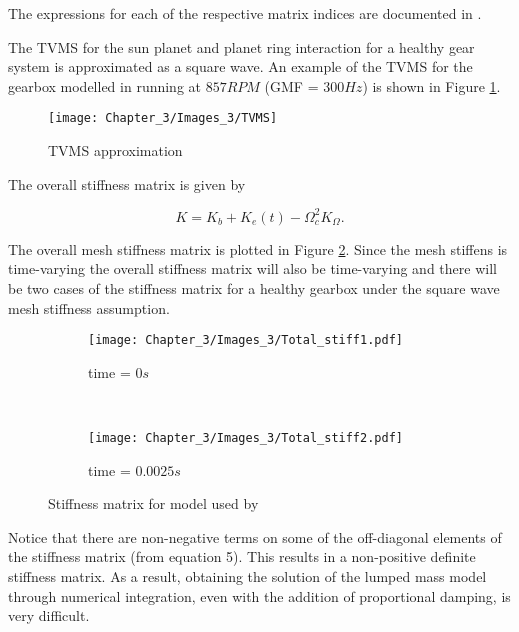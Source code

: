 The expressions for each of the respective matrix indices are documented in \cite{Chaari2006}.


The TVMS for the sun planet and planet ring interaction for a healthy gear system is approximated as a square wave. An example of the TVMS for the gearbox modelled in \cite{Chaari2006} running at $857RPM$ (GMF = $300Hz$) is shown in Figure \ref{F:TVMS}.


\begin{figure}[H]
	\centering
	\texttt{[image: Chapter\_3/Images\_3/TVMS]}
	\caption{TVMS approximation}
	\label{F:TVMS}
\end{figure}


The overall stiffness matrix is given by

\begin{equation}
K = K_{b}+K_{e}(t)-\Omega_{c}^{2} K_{\Omega}.
\end{equation}

The overall mesh stiffness matrix is plotted in Figure \ref{F:Stiffness}. Since the mesh stiffens is time-varying the overall stiffness matrix will also be time-varying and there will be two cases of the stiffness matrix for a healthy gearbox under the square wave mesh stiffness assumption. 

\begin{figure}[H]
	\centering
	\begin{subfigure}{0.49\textwidth}
		\texttt{[image: Chapter\_3/Images\_3/Total\_stiff1.pdf]}
		\caption{time = $0s$ }
	\end{subfigure}
	~
	\begin{subfigure}{0.49\textwidth}
		\texttt{[image: Chapter\_3/Images\_3/Total\_stiff2.pdf]}
		\caption{time = $0.0025s$ }
	\end{subfigure}
	
	\caption{Stiffness matrix for model used by \cite{Chaari2006}}
	\label{F:Stiffness}
\end{figure}

Notice that there are non-negative terms on some of the off-diagonal elements of the stiffness matrix (from \cite{Chaari2006} equation 5). This results in a non-positive definite stiffness matrix. As a result, obtaining the solution of the lumped mass model through numerical integration, even with the addition of proportional damping, is very difficult.  

